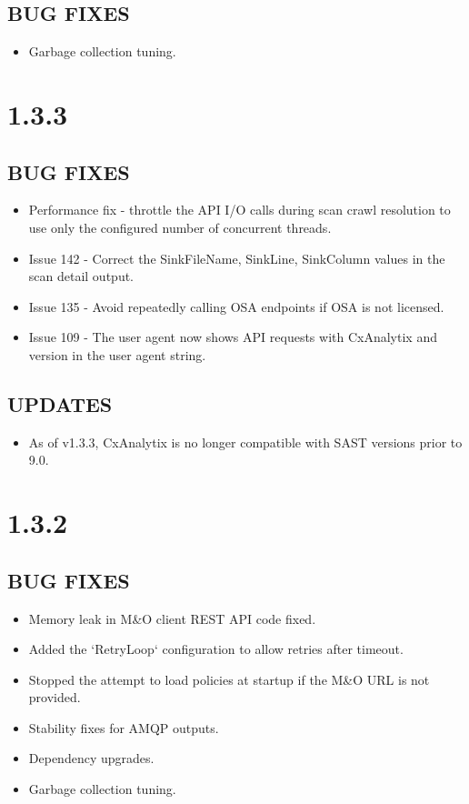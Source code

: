     \subsection*{BUG FIXES}
    \begin{itemize}
        \item Garbage collection tuning.
    \end{itemize}


\section{1.3.3}
\subsection*{BUG FIXES}
    \begin{itemize}
        \item Performance fix - throttle the API I/O calls during scan crawl resolution to use only the configured number of concurrent threads.
        \item Issue 142 - Correct the SinkFileName, SinkLine, SinkColumn values in the scan detail output.
        \item Issue 135 - Avoid repeatedly calling OSA endpoints if OSA is not licensed.
        \item Issue 109 - The user agent now shows API requests with CxAnalytix and version in the user agent string.
    \end{itemize}

\subsection*{UPDATES}
    \begin{itemize}
        \item As of v1.3.3, CxAnalytix is no longer compatible with SAST versions prior to 9.0.
    \end{itemize}

\section{1.3.2}
\subsection*{BUG FIXES}
    \begin{itemize}
        \item Memory leak in M\&O client REST API code fixed.
        \item Added the `RetryLoop` configuration to allow retries after timeout.
        \item Stopped the attempt to load policies at startup if the M\&O URL is not provided.
        \item Stability fixes for AMQP outputs.
        \item Dependency upgrades.
        \item Garbage collection tuning.
    \end{itemize}


